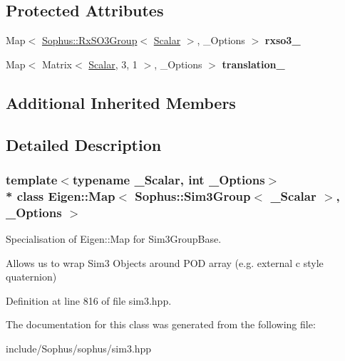 \subsection*{Protected Attributes}
\begin{DoxyCompactItemize}
\item 
Map$<$ \hyperlink{class_sophus_1_1_rx_s_o3_group}{Sophus\+::\+Rx\+S\+O3\+Group}$<$ \hyperlink{class_eigen_1_1_map_3_01_sophus_1_1_sim3_group_3_01___scalar_01_4_00_01___options_01_4_a86a161ee4ef7691f50a6de409dda5a3e}{Scalar} $>$, \+\_\+\+Options $>$ {\bfseries rxso3\+\_\+}\hypertarget{class_eigen_1_1_map_3_01_sophus_1_1_sim3_group_3_01___scalar_01_4_00_01___options_01_4_aaf4c1d4c7fb13868556c6620a7ef3c64}{}\label{class_eigen_1_1_map_3_01_sophus_1_1_sim3_group_3_01___scalar_01_4_00_01___options_01_4_aaf4c1d4c7fb13868556c6620a7ef3c64}

\item 
Map$<$ Matrix$<$ \hyperlink{class_eigen_1_1_map_3_01_sophus_1_1_sim3_group_3_01___scalar_01_4_00_01___options_01_4_a86a161ee4ef7691f50a6de409dda5a3e}{Scalar}, 3, 1 $>$, \+\_\+\+Options $>$ {\bfseries translation\+\_\+}\hypertarget{class_eigen_1_1_map_3_01_sophus_1_1_sim3_group_3_01___scalar_01_4_00_01___options_01_4_ad6bee375a3a2f9f7c05c7cd91bc81d7d}{}\label{class_eigen_1_1_map_3_01_sophus_1_1_sim3_group_3_01___scalar_01_4_00_01___options_01_4_ad6bee375a3a2f9f7c05c7cd91bc81d7d}

\end{DoxyCompactItemize}
\subsection*{Additional Inherited Members}


\subsection{Detailed Description}
\subsubsection*{template$<$typename \+\_\+\+Scalar, int \+\_\+\+Options$>$\\*
class Eigen\+::\+Map$<$ Sophus\+::\+Sim3\+Group$<$ \+\_\+\+Scalar $>$, \+\_\+\+Options $>$}

Specialisation of Eigen\+::\+Map for Sim3\+Group\+Base. 

Allows us to wrap Sim3 Objects around P\+OD array (e.\+g. external c style quaternion) 

Definition at line 816 of file sim3.\+hpp.



The documentation for this class was generated from the following file\+:\begin{DoxyCompactItemize}
\item 
include/\+Sophus/sophus/sim3.\+hpp\end{DoxyCompactItemize}
